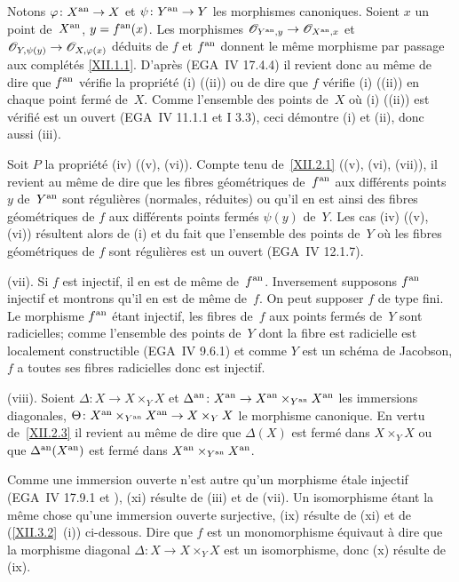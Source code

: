 Notons $\varphi \colon X^\an \to X $ et $\psi \colon Y^\an \to Y$ les
morphismes canoniques. Soient $x$ un point de~$X^{\mathrm{an}}$, $y = f^{\mathrm{an}}
(x)$. Les morphismes $\cal{O}_{Y^\an, y} \to {\mathcal O}_{X^\an, x}$
et $\cal{O}_{Y, \psi(y)} \to \cal{O}_{X, \varphi(x)} $ d\'eduits de
$f$ et $f^{\mathrm{an}}$ donnent le m\^eme morphisme par passage aux
compl\'et\'es \eqref{XII.1.1}. D'apr\`es \cite[ch.\, 3 \S 5 prop.\, 4]{XII.2}
(\resp EGA~IV 17.4.4) il revient donc au m\^eme de dire que $f^{\mathrm{an}} $
v\'erifie la propri\'et\'e (i) (\resp (ii)) ou de dire que $f$
v\'erifie (i) (\resp (ii)) en chaque point ferm\'e de~$X$. Comme
l'ensemble des points de~$X$ o\`u (i) (\resp (ii)) est
v\'erifi\'e est un ouvert (EGA~IV 11.1.1 et I 3.3), ceci
d\'emontre (i) et (ii), donc aussi (iii).

\enlargethispage{.5cm}Soit $P$ la propri\'et\'e (iv) (\resp (v), \resp (vi)). Compte tenu
de~\ref{XII.2.1} ((v), (vi), (vii)), il revient au m\^eme de dire que
les fibres g\'eom\'etriques de~$f^{\mathrm{an}}$ aux diff\'erents points
$y$ de~$Y^{\mathrm{an}}$ sont r\'eguli\`eres (\resp normales, \resp r\'eduites) ou qu'il en est ainsi des fibres g\'eom\'etriques de
$f$ aux diff\'erents points ferm\'es $\psi (y)$ de~$Y$. Les cas
(iv) (\resp (v), \resp (vi)) r\'esultent alors de (i) et du fait que
l'ensemble des points de~$Y$ o\`u les fibres g\'eom\'etriques de
$f$ sont r\'eguli\`eres est un ouvert (EGA~IV 12.1.7).

(vii). Si $f$ est injectif, il en est de m\^eme de~$f^{\mathrm{an}}$.
Inversement supposons $f^{\mathrm{an}}$ injectif et montrons qu'il en est de
m\^eme de~$f$. On peut supposer
$f$ de type fini. Le morphisme $f^{\mathrm{an}}$ \'etant injectif, les fibres
de~$f$ aux points ferm\'es de~$Y$ sont radicielles; comme l'ensemble
des points de~$Y$ dont la fibre est radicielle est localement
constructible (EGA~IV 9.6.1) et comme $Y$ est un sch\'ema de
Jacobson, $f$ a toutes ses fibres radicielles donc est injectif.

(viii). Soient $\Delta \colon X \to X \times_Y X $ et $\Delta^\an
\colon X^\an \to X^\an \times_{Y^\an} X^\an $ les immersions
diagonales, $\Theta \colon X^\an \times_{Y^\an} X^\an \to X \times_Y X
$ le morphisme canonique. En vertu de~\ref{XII.2.3} il revient au
m\^eme de dire que $\Delta (X)$ est ferm\'e dans $X \times_Y X $
ou que $\Delta^{\mathrm{an}} (X^{\mathrm{an}})$ est ferm\'e dans $X^{\mathrm{an}} \times_{Y^{\mathrm{an}}}
X^{\mathrm{an}}$.

Comme une immersion ouverte n'est autre qu'un morphisme \'etale
injectif (EGA~IV 17.9.1 et \cite[ \S 1]{XII.4}), (xi) r\'esulte de (iii)
et de (vii). Un isomorphisme \'etant la m\^eme chose qu'une
immersion ouverte surjective, (ix) r\'esulte de (xi) et de
(\ref{XII.3.2}~(i)) ci-dessous. Dire que $f$ est un monomorphisme
\'equivaut \`a dire que la morphisme diagonal $\Delta \colon X \to
X \times_Y X$ est un isomorphisme, donc (x) r\'esulte de (ix).

